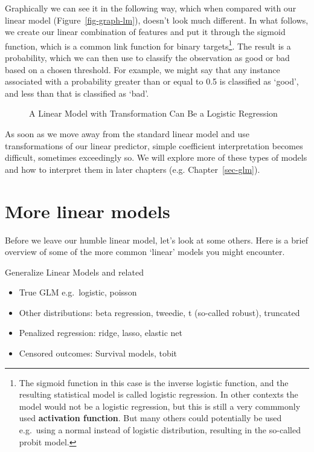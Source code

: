 \documentclass[
  letterpaper,
]{krantz}
\providecommand{\tightlist}{%
  \setlength{\itemsep}{0pt}\setlength{\parskip}{0pt}}\usepackage{longtable,booktabs,array}
\begin{document}
Graphically we can see it in the following way, which when compared with
our linear model (Figure~\ref{fig-graph-lm}), doesn't look much
different. In what follows, we create our linear combination of features
and put it through the sigmoid function, which is a common link function
for binary targets\footnote{The sigmoid function in this case is the
  inverse logistic function, and the resulting statistical model is
  called logistic regression. In other contexts the model would not be a
  logistic regression, but this is still a very commmonly used
  \textbf{activation function}. But many others could potentially be
  used e.g.~using a normal instead of logistic distribution, resulting
  in the so-called probit model.}. The result is a probability, which we
can then use to classify the observation as good or bad based on a
chosen threshold. For example, we might say that any instance associated
with a probability greater than or equal to 0.5 is classified as `good',
and less than that is classified as `bad'.

\begin{figure}[H]


\caption{\label{fig-graph-logistic}A Linear Model with Transformation
Can Be a Logistic Regression}

\end{figure}%

As soon as we move away from the standard linear model and use
transformations of our linear predictor, simple coefficient
interpretation becomes difficult, sometimes exceedingly so. We will
explore more of these types of models and how to interpret them in later
chapters (e.g. Chapter~\ref{sec-glm}).

\section{More linear models}\label{sec-lm-more}

Before we leave our humble linear model, let's look at some others. Here
is a brief overview of some of the more common `linear' models you might
encounter.

Generalize Linear Models and related

\begin{itemize}
\tightlist
\item
  True GLM e.g.~logistic, poisson
\item
  Other distributions: beta regression, tweedie, t (so-called robust),
  truncated
\item
  Penalized regression: ridge, lasso, elastic net
\item
  Censored outcomes: Survival models, tobit
\end{itemize}
\end{document}
